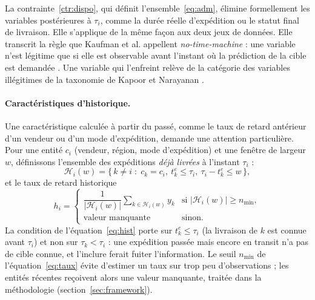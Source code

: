 \documentclass[11pt,a4paper]{article}
\theoremstyle{definition}
\begin{document}
La contrainte~\ref{ctr:dispo}, qui définit l'ensemble~\eqref{eq:adm}, élimine formellement les variables postérieures à $\tau_i$, comme la durée réelle d'expédition ou le statut final de livraison. Elle s'applique de la même façon aux deux jeux de données. Elle transcrit la règle que Kaufman et al. appellent \emph{no-time-machine} : une variable n'est légitime que si elle est observable avant l'instant où la prédiction de la cible est demandée \cite{kaufman2012leakage}. Une variable qui l'enfreint relève de la catégorie des variables illégitimes de la taxonomie de Kapoor et Narayanan \cite{kapoor2023leakage}.

\paragraph{Caractéristiques d'historique.} Une caractéristique calculée à partir du passé, comme le taux de retard antérieur d'un vendeur ou d'un mode d'expédition, demande une attention particulière. Pour une entité $c_i$ (vendeur, région, mode d'expédition) et une fenêtre de largeur $w$, définissons l'ensemble des expéditions \emph{déjà livrées} à l'instant $\tau_i$ :
\begin{equation}
  \mathcal{H}_i(w) = \bigl\{\, k \neq i \;:\; c_k = c_i,\ t_k^{e} \le \tau_i,\ \tau_i - t_k^{e} \le w \,\bigr\},
  \label{eq:hist}
\end{equation}
et le taux de retard historique
\begin{equation}
  h_i =
  \begin{cases}
    \dfrac{1}{|\mathcal{H}_i(w)|} \displaystyle\sum_{k \in \mathcal{H}_i(w)} y_k & \text{si } |\mathcal{H}_i(w)| \ge n_{\min},\\[2ex]
    \text{valeur manquante} & \text{sinon.}
  \end{cases}
  \label{eq:taux}
\end{equation}
La condition de l'équation~\eqref{eq:hist} porte sur $t_k^{e} \le \tau_i$ (la livraison de $k$ est connue avant $\tau_i$) et non sur $\tau_k < \tau_i$ : une expédition passée mais encore en transit n'a pas de cible connue, et l'inclure ferait fuiter l'information. Le seuil $n_{\min}$ de l'équation~\eqref{eq:taux} évite d'estimer un taux sur trop peu d'observations ; les entités récentes reçoivent alors une valeur manquante, traitée dans la méthodologie (section~\ref{sec:framework}).
\end{document}
